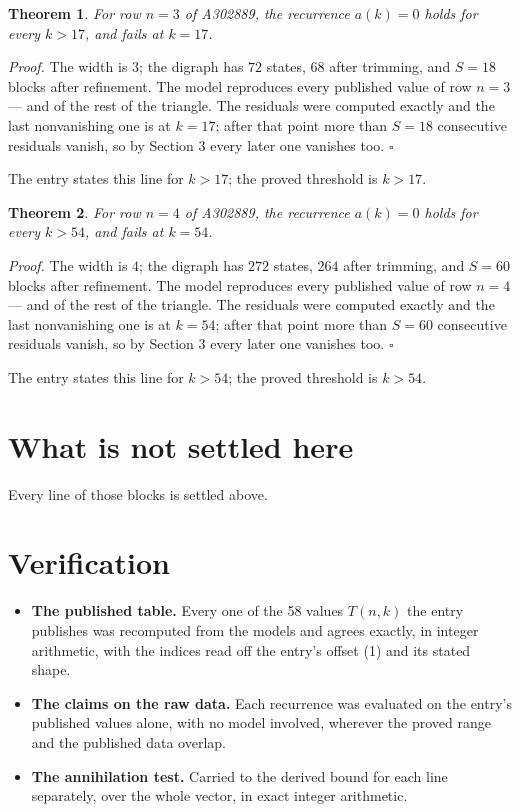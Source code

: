 \documentclass[11pt]{article}
\newtheorem{theorem}{Theorem}
\theoremstyle{definition}
\begin{document}
\begin{theorem} For row $n = 3$ of A302889, the recurrence $a(k) = 0$ holds for every $k > 17$, and fails at $k = 17$.\end{theorem}

{\itshape Proof.} The width is $3$; the digraph has $72$ states, $68$ after trimming, and $S = 18$ blocks after refinement. The model reproduces every published value of row $n = 3$ --- and of the rest of the triangle. The residuals were computed exactly and the last nonvanishing one is at $k = 17$; after that point more than $S = 18$ consecutive residuals vanish, so by Section 3 every later one vanishes too. $\square$

The entry states this line for $k > 17$; the proved threshold is $k > 17$.

\begin{theorem} For row $n = 4$ of A302889, the recurrence $a(k) = 0$ holds for every $k > 54$, and fails at $k = 54$.\end{theorem}

{\itshape Proof.} The width is $4$; the digraph has $272$ states, $264$ after trimming, and $S = 60$ blocks after refinement. The model reproduces every published value of row $n = 4$ --- and of the rest of the triangle. The residuals were computed exactly and the last nonvanishing one is at $k = 54$; after that point more than $S = 60$ consecutive residuals vanish, so by Section 3 every later one vanishes too. $\square$

The entry states this line for $k > 54$; the proved threshold is $k > 54$.

\section{What is not settled here}

Every line of those blocks is settled above.

\section{Verification}

\begin{itemize}

\item {\bfseries The published table.} Every one of the 58 values $T(n,k)$ the entry publishes was recomputed from the models and agrees exactly, in integer arithmetic, with the indices read off the entry's offset (1) and its stated shape.

\item {\bfseries The claims on the raw data.} Each recurrence was evaluated on the entry's published values alone, with no model involved, wherever the proved range and the published data overlap.

\item {\bfseries The annihilation test.} Carried to the derived bound for each line separately, over the whole vector, in exact integer arithmetic.

\end{itemize}
\end{document}
